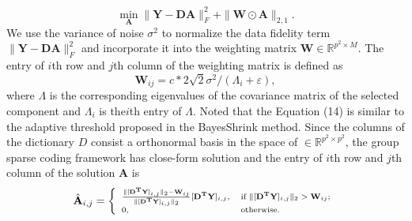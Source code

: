 \documentclass[10pt,twocolumn,letterpaper]{article}
\begin{document}
\begin{equation}
\min_{\mathbf{A}}{\|\mathbf{Y}-\mathbf{DA}\|_{F}^{2}+\|\mathbf{W}\odot \mathbf{A}\|_{2,1}}.
\end{equation}
We use the variance of noise $\sigma^{2}$ to normalize the data fidelity term $\|\mathbf{Y}-\mathbf{DA}\|_{F}^{2}$ and incorporate it into the weighting matrix $\mathbf{W}\in\mathbb{R}^{p^{2}\times M}$. The entry of $i$th row and $j$th column of the weighting matrix is defined as
\begin{equation}
\mathbf{W}_{ij} = c*2\sqrt{2}\sigma^{2}/(\Lambda_{i}+\varepsilon),
\end{equation}
where $\Lambda$ is the corresponding eigenvalues of the covariance matrix of the selected component and $\Lambda_{i}$ is the$i$th entry of $\Lambda$. Noted that the Equation (14) is similar to the adaptive threshold proposed in the BayesShrink method\cite{bayesshrink}. Since the columns of the dictionary $D$ consist a orthonormal basis in the space of $\in\mathbb{R}^{p^{2}\times p^{2}}$, the group sparse coding framework has close-form solution\cite{fastgsc,lrr} and the entry of $i$th row and $j$th column of the solution $\mathbf{A}$ is 
\begin{displaymath}
\scriptsize
\hat{\mathbf{A}}_{i,j} = \left\{ \begin{array}{ll}
\frac{\|[\mathbf{D^{T}Y}]_{i,j}\|_{2}-\mathbf{W}_{ij}}{\|[\mathbf{D^{T}Y}]_{i,j}\|_{2}}[\mathbf{D^{T}Y}]_{i,j},&\textrm{if $\|[\mathbf{D^{T}Y}]_{i,j}\|_{2}>\mathbf{W}_{ij}$};\\
0, & \textrm{otherwise}.
\end{array} \right.
\end{displaymath}
\end{document}
